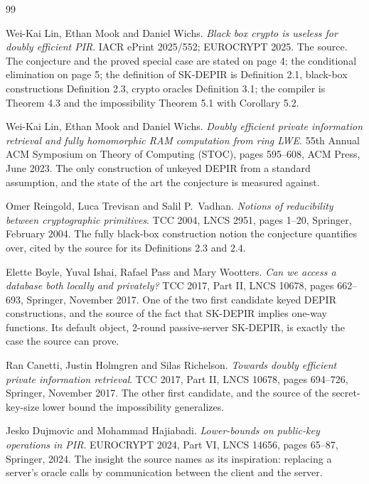 \documentclass{aicr-conjecture}
\begin{document}
\begin{aicrbibliography}{99}

Wei-Kai Lin, Ethan Mook and Daniel Wichs.
\emph{Black box crypto is useless for doubly efficient PIR}.
IACR ePrint 2025/552; EUROCRYPT 2025.
The source. The conjecture and the proved special case are stated on
page 4; the conditional elimination on page 5; the definition of
SK-DEPIR is Definition 2.1, black-box constructions Definition 2.3,
crypto oracles Definition 3.1; the compiler is Theorem 4.3 and the
impossibility Theorem 5.1 with Corollary 5.2.

Wei-Kai Lin, Ethan Mook and Daniel Wichs.
\emph{Doubly efficient private information retrieval and fully
homomorphic RAM computation from ring LWE}.
55th Annual ACM Symposium on Theory of Computing (STOC), pages 595--608,
ACM Press, June 2023.
The only construction of unkeyed DEPIR from a standard assumption, and
the state of the art the conjecture is measured against.

Omer Reingold, Luca Trevisan and Salil P.\ Vadhan.
\emph{Notions of reducibility between cryptographic primitives}.
TCC 2004, LNCS 2951, pages 1--20, Springer, February 2004.
The fully black-box construction notion the conjecture quantifies over,
cited by the source for its Definitions 2.3 and 2.4.

Elette Boyle, Yuval Ishai, Rafael Pass and Mary Wootters.
\emph{Can we access a database both locally and privately?}
TCC 2017, Part II, LNCS 10678, pages 662--693, Springer, November 2017.
One of the two first candidate keyed DEPIR constructions, and the source
of the fact that SK-DEPIR implies one-way functions. Its default object,
2-round passive-server SK-DEPIR, is exactly the case the source can prove.

Ran Canetti, Justin Holmgren and Silas Richelson.
\emph{Towards doubly efficient private information retrieval}.
TCC 2017, Part II, LNCS 10678, pages 694--726, Springer, November 2017.
The other first candidate, and the source of the secret-key-size
lower bound the impossibility generalizes.

Jesko Dujmovic and Mohammad Hajiabadi.
\emph{Lower-bounds on public-key operations in PIR}.
EUROCRYPT 2024, Part VI, LNCS 14656, pages 65--87, Springer, 2024.
The insight the source names as its inspiration: replacing a server's
oracle calls by communication between the client and the server.

\end{aicrbibliography}
\end{document}
